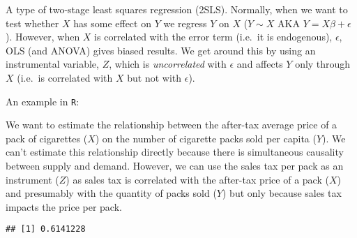\documentclass[
]{article}
\newenvironment{Shaded}{\begin{snugshade}}{\end{snugshade}}
\newcommand{\CommentTok}[1]{\textcolor[rgb]{0.56,0.35,0.01}{\textit{#1}}}
\newcommand{\FunctionTok}[1]{\textcolor[rgb]{0.00,0.00,0.00}{#1}}
\newcommand{\NormalTok}[1]{#1}
\newcommand{\OtherTok}[1]{\textcolor[rgb]{0.56,0.35,0.01}{#1}}
\newcommand{\SpecialCharTok}[1]{\textcolor[rgb]{0.00,0.00,0.00}{#1}}
\newcommand{\StringTok}[1]{\textcolor[rgb]{0.31,0.60,0.02}{#1}}
\begin{document}
A type of two-stage least squares regression (2SLS). Normally, when we
want to test whether \(X\) has some effect on \(Y\) we regress \(Y\) on
\(X\) (\(Y\sim X\) AKA \(Y=X\beta + \epsilon\)). However, when \(X\) is
correlated with the error term (i.e.~it is endogenous), \(\epsilon\),
OLS (and ANOVA) gives biased results. We get around this by using an
instrumental variable, \(Z\), which is \emph{uncorrelated} with
\(\epsilon\) and affects \(Y\) only through \(X\) (i.e.~is correlated
with \(X\) but not with \(\epsilon\)).

An example in \texttt{R}:

We want to estimate the relationship between the after-tax average price
of a pack of cigarettes (\(X\)) on the number of cigarette packs sold
per capita (\(Y\)). We can't estimate this relationship directly because
there is simultaneous causality between supply and demand. However, we
can use the sales tax per pack as an instrument (\(Z\)) as sales tax is
correlated with the after-tax price of a pack (\(X\)) and presumably
with the quantity of packs sold (\(Y\)) but only because sales tax
impacts the price per pack.

\begin{Shaded}
\end{Shaded}

\begin{verbatim}
## [1] 0.6141228
\end{verbatim}
\end{document}

